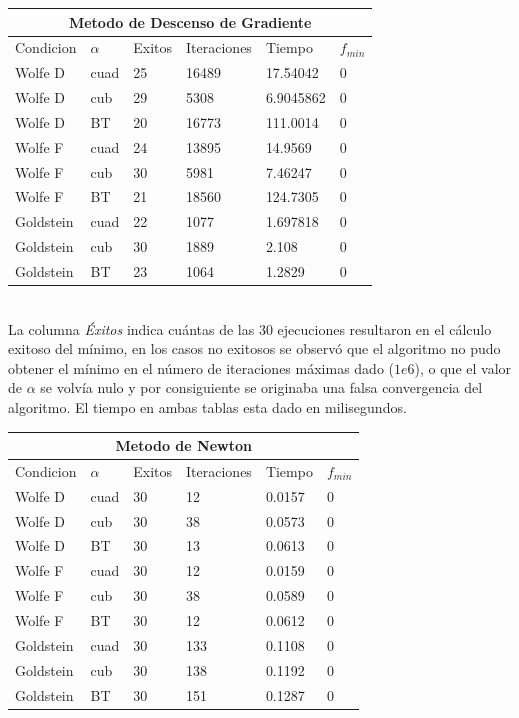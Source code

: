 \documentclass[10pt,journal,compsoc]{styles/IEEEtran}
\begin{document}
\begin{tabular}{ |p{1.5cm}||p{0.7cm}|p{0.8cm}|p{1.5cm}|p{1.4cm}|p{0.6cm}|  }
 \hline
 \multicolumn{6}{|c|}{Metodo de Descenso de Gradiente} \\
 \hline
 Condicion&$\alpha$&Exitos&Iteraciones&Tiempo&$f_{min}$\\
 \hline
 Wolfe D & cuad & 25 & 16489 & 17.54042 & 0\\
 Wolfe D & cub & 29 & 5308 & 6.9045862 & 0\\
 Wolfe D & BT & 20 & 16773 & 111.0014 & 0\\
 Wolfe F & cuad & 24 & 13895 & 14.9569 & 0\\
 Wolfe F & cub & 30 & 5981 & 7.46247 & 0\\
 Wolfe F & BT & 21 & 18560 & 124.7305 & 0\\
 Goldstein & cuad & 22 & 1077 & 1.697818 & 0\\
 Goldstein & cub & 30 & 1889 & 2.108 & 0\\
 Goldstein & BT & 23 & 1064 & 1.2829 & 0\\
 \hline
\end{tabular}\\


La columna \emph{\'Exitos} indica cu\'antas de las 30 ejecuciones resultaron en el c\'alculo exitoso del m\'inimo, en los casos no exitosos se observ\'o que el algoritmo no pudo obtener el m\'inimo en el n\'umero de iteraciones m\'aximas dado ($1e6$), o que el valor de $\alpha$ se volv\'ia nulo y por consiguiente se originaba una falsa convergencia del algoritmo. El tiempo en ambas tablas esta dado en milisegundos.\\

\begin{tabular}{ |p{1.5cm}||p{0.7cm}|p{0.8cm}|p{1.5cm}|p{1.4cm}|p{0.6cm}|  }
 \hline
 \multicolumn{6}{|c|}{Metodo de Newton} \\
 \hline
 Condicion&$\alpha$&Exitos&Iteraciones&Tiempo&$f_{min}$\\
 \hline
 Wolfe D & cuad & 30 & 12 & 0.0157 & 0\\
 Wolfe D & cub & 30 & 38 & 0.0573 & 0\\
 Wolfe D & BT & 30 & 13 & 0.0613 & 0\\
 Wolfe F & cuad & 30 & 12 & 0.0159 & 0\\
 Wolfe F & cub & 30 & 38 & 0.0589 & 0\\
 Wolfe F & BT & 30 & 12 & 0.0612 & 0\\
 Goldstein & cuad & 30 & 133 & 0.1108 & 0\\
 Goldstein & cub & 30 & 138 & 0.1192 & 0\\
 Goldstein & BT & 30 & 151 & 0.1287 & 0\\
 \hline
\end{tabular}
\end{document}
